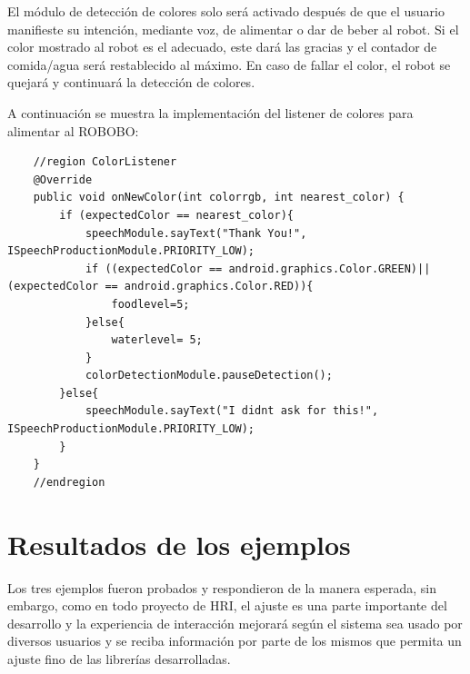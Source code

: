 El módulo de detección de colores solo será activado después de que el usuario manifieste su intención, mediante voz, de alimentar o dar de beber al robot.
Si el color mostrado al robot es el adecuado, este dará las gracias y el contador de comida/agua será restablecido al máximo. En caso de fallar el color, el robot se quejará y continuará la detección de colores.


A continuación se muestra la implementación del listener de colores para alimentar al ROBOBO:
\begin{lstlisting}
	//region ColorListener
    @Override
    public void onNewColor(int colorrgb, int nearest_color) {
        if (expectedColor == nearest_color){
            speechModule.sayText("Thank You!", ISpeechProductionModule.PRIORITY_LOW);
            if ((expectedColor == android.graphics.Color.GREEN)||(expectedColor == android.graphics.Color.RED)){
                foodlevel=5;
            }else{
                waterlevel= 5;
            }
            colorDetectionModule.pauseDetection();
        }else{
            speechModule.sayText("I didnt ask for this!", ISpeechProductionModule.PRIORITY_LOW);
        }
    }
    //endregion
\end{lstlisting}


\section{Resultados de los ejemplos}
\label{sec:example-results}

Los tres ejemplos fueron probados y respondieron de la manera esperada, sin embargo, como en todo proyecto de HRI, el ajuste es una parte importante del desarrollo y la experiencia de interacción mejorará según el sistema sea usado por diversos usuarios y se reciba información por parte de los mismos que permita un ajuste fino de las librerías desarrolladas.





\newpage

